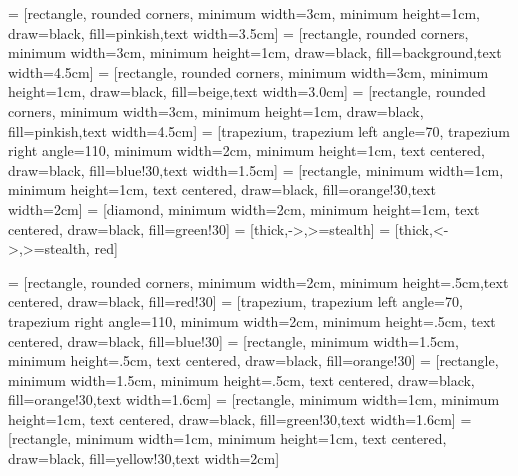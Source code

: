 \usepackage{graphicx}
\usepackage{hyperref, url}
\hypersetup{colorlinks,citecolor=myorange,filecolor=red,linkcolor=brown,urlcolor=blue}

\usepackage{longtable,booktabs}
\usepackage{amssymb,amsmath}
\usepackage{animate}
\usepackage{subfig}
\usepackage{tikz}
\usetikzlibrary{shapes.geometric, arrows,shapes.symbols,decorations.pathreplacing}
 = [rectangle, rounded corners, minimum width=3cm, minimum height=1cm, draw=black, fill=pinkish,text width=3.5cm]
 = [rectangle, rounded corners, minimum width=3cm, minimum height=1cm, draw=black, fill=background,text width=4.5cm]
 = [rectangle, rounded corners, minimum width=3cm, minimum height=1cm, draw=black, fill=beige,text width=3.0cm]
 = [rectangle, rounded corners, minimum width=3cm, minimum height=1cm, draw=black, fill=pinkish,text width=4.5cm]
 = [trapezium, trapezium left angle=70, trapezium right angle=110, minimum width=2cm, minimum height=1cm, text centered, draw=black, fill=blue!30,text width=1.5cm]
 = [rectangle, minimum width=1cm, minimum height=1cm, text centered, draw=black, fill=orange!30,text width=2cm]
 = [diamond, minimum width=2cm, minimum height=1cm, text centered, draw=black, fill=green!30]
 = [thick,->,>=stealth]
 = [thick,<->,>=stealth, red]


 = [rectangle, rounded corners, minimum width=2cm, minimum height=.5cm,text centered, draw=black, fill=red!30]
 = [trapezium, trapezium left angle=70, trapezium right angle=110, minimum width=2cm, minimum height=.5cm, text centered, draw=black, fill=blue!30]
 = [rectangle, minimum width=1.5cm, minimum height=.5cm, text centered, draw=black, fill=orange!30]
 = [rectangle, minimum width=1.5cm, minimum height=.5cm, text centered, draw=black, fill=orange!30,text width=1.6cm]
 = [rectangle, minimum width=1cm, minimum height=1cm, text centered, draw=black, fill=green!30,text width=1.6cm]
 = [rectangle, minimum width=1cm, minimum height=1cm, text centered, draw=black, fill=yellow!30,text width=2cm]

\usepackage{pifont}%
\newcommand{\cmark}{\ding{51}}%
\newcommand{\xmark}{\ding{55}}%

\usepackage{ulem} %

